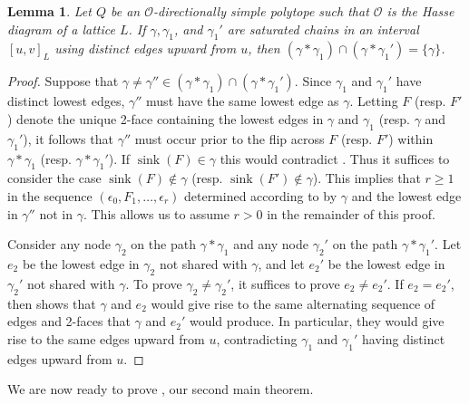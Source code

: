 \documentclass[12pt]{amsart}
\theoremstyle{plain}
\newtheorem{lem}[thm]{Lemma}
\theoremstyle{definition}
\theoremstyle{remark}
\DeclareMathOperator{\sink}{sink}
\begin{document}
\begin{lem}\label{lem:vertex-disjoint}
Let $Q$ be an $\mathcal{O}$-directionally simple polytope such that $\mathcal{O}$ is the Hasse diagram of a lattice $L$.   If $\gamma, \gamma_1$, and $\gamma_1'$ are saturated chains in an interval $[u,v]_L$ using distinct edges upward from $u$, then $(\gamma * \gamma_1) \cap (\gamma * \gamma_1')=\{\gamma\}$.
\end{lem}

\begin{proof}
Suppose that $\gamma \neq \gamma '' \in (\gamma * \gamma_1)\cap (\gamma * \gamma_1')$.
Since $\gamma_1$ and $\gamma_1'$ have distinct lowest edges, $\gamma ''$ must have the same lowest edge as $\gamma$. Letting $F$ (resp. $F'$) denote the unique 2-face containing the lowest edges in $\gamma $ and $\gamma_1 $ (resp. $\gamma $ and $\gamma_1'$), it follows that $\gamma''$ must occur prior to the flip across $F$ (resp. $F'$) within $\gamma * \gamma_1$ (resp. $\gamma * \gamma_1'$). If $\sink (F)\in \gamma $ this would contradict . Thus it suffices to consider the case
$\sink (F) \not \in \gamma $ (resp. $\sink (F') \not \in \gamma $). 
This implies that $r\ge 1$ in  the sequence $(\epsilon_0,F_1,\dots ,\epsilon_r)$ determined according to  by $\gamma$ and the lowest edge in $\gamma ''$ not in $\gamma$. This allows us to  assume $r>0$ in the remainder of this proof.

Consider any node $\gamma_2$ on the path $\gamma*\gamma_1$ and any node $\gamma_2'$ on the path $\gamma * \gamma_1'$.  Let $e_2$ be the lowest edge in $\gamma_2$ not shared with $\gamma $, and let $e_2'$ be the lowest edge in $\gamma_2' $ not shared with $\gamma $.   To prove $\gamma_2 \ne \gamma_2'$, it suffices to prove $e_2 \ne e_2'$.  If $e_2 = e_2'$, then  shows that $\gamma $ and $e_2$ would give rise to the same  alternating sequence of edges and 2-faces that  $\gamma $ and $e_2'$ would produce.  In particular, they would give rise to the same edges upward from $u$, contradicting $\gamma_1$ and $\gamma_1'$ having  distinct edges upward from $u$.
\end{proof}

We are now ready to prove , our second main theorem.
\end{document}
